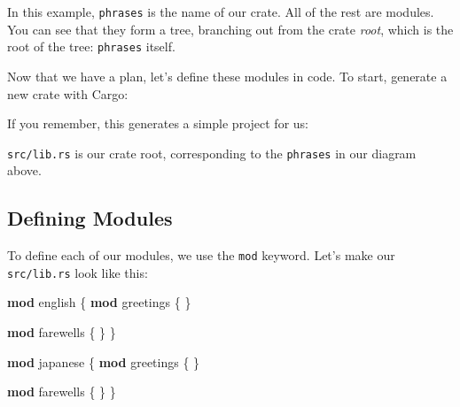 \documentclass[a4paper,]{book}
\newenvironment{Shaded}{\begin{snugshade}}{\end{snugshade}}
\newcommand{\KeywordTok}[1]{\textcolor[rgb]{0.13,0.29,0.53}{\textbf{{#1}}}}
\newcommand{\NormalTok}[1]{{#1}}
\begin{document}
In this example, \texttt{phrases} is the name of our crate. All of the
rest are modules. You can see that they form a tree, branching out from
the crate \emph{root}, which is the root of the tree: \texttt{phrases}
itself.

Now that we have a plan, let's define these modules in code. To start,
generate a new crate with Cargo:

\begin{Shaded}
\end{Shaded}

If you remember, this generates a simple project for us:

\begin{Shaded}
\end{Shaded}

\texttt{src/lib.rs} is our crate root, corresponding to the
\texttt{phrases} in our diagram above.

\subsection{Defining Modules}\label{defining-modules}

To define each of our modules, we use the \texttt{mod} keyword. Let's
make our \texttt{src/lib.rs} look like this:

\begin{Shaded}
\begin{Highlighting}[]
\KeywordTok{mod} \NormalTok{english \{}
    \KeywordTok{mod} \NormalTok{greetings \{}
    \NormalTok{\}}

    \KeywordTok{mod} \NormalTok{farewells \{}
    \NormalTok{\}}
\NormalTok{\}}

\KeywordTok{mod} \NormalTok{japanese \{}
    \KeywordTok{mod} \NormalTok{greetings \{}
    \NormalTok{\}}

    \KeywordTok{mod} \NormalTok{farewells \{}
    \NormalTok{\}}
\NormalTok{\}}
\end{Highlighting}
\end{Shaded}
\end{document}
